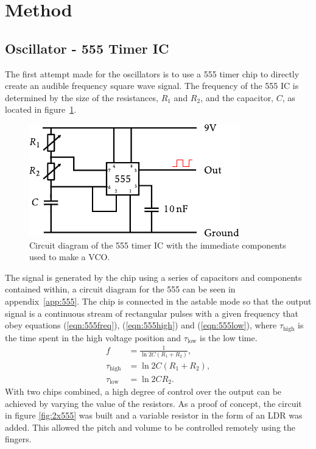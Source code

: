 \section{Method}
\subsection{Oscillator - 555 Timer IC}
\label{sec:555}
The first attempt made for the oscillators is to use a 555 timer chip to directly create an audible frequency square wave signal. The frequency of the 555 IC is determined by the size of the resistances, $R_1$ and $R_2$, and the capacitor, $C$, as located in figure~\ref{fig:555}.

\begin{figure}[htbp]
	\begin{center}
		\includegraphics[scale=1.2]{report_img/555}
		\caption{Circuit diagram of the 555 timer IC with the immediate components used to make a VCO.}
		\label{fig:555}
	\end{center}
\end{figure}

The signal is generated by the chip using a series of capacitors and components contained within, a circuit diagram for the 555 can be seen in appendix~\ref{app:555}. The chip is connected in the astable mode so that the output signal is a continuous stream of rectangular pulses with a given frequency that obey equations (\ref{eqn:555freq}), (\ref{eqn:555high}) and (\ref{eqn:555low}), where $\tau_{\text{high}}$ is the time spent in the high voltage position and $\tau_{\text{low}}$ is the low time.\cite{NE555}
\begin{align}
	\label{eqn:555freq}
	f &= \frac{1}{\ln{2}C(R_1+R_2)}, \\
	\label{eqn:555high}
	\tau_{\text{high}} &= \ln{2}C(R_1+R_2), \\
	\label{eqn:555low}
	\tau_{\text{low}} &= \ln{2}CR_2. 
\end{align}
With two chips combined, a high degree of control over the output can be achieved by varying the value of the resistors. As a proof of concept, the circuit in figure \ref{fig:2x555} was built and a variable resistor in the form of an LDR was added. This allowed the pitch and volume to be controlled remotely using the fingers.

